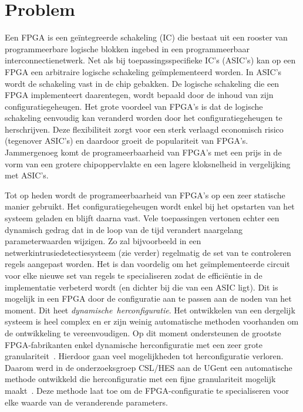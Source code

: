 \documentclass[a4paper,oneside,12pt]{article}
\begin{document}
\newpage

\tableofcontents

\clearpage

\section{Problem}

Een FPGA is een ge\"integreerde schakeling (IC) die bestaat uit een rooster van programmeerbare logische blokken ingebed in een programmeerbaar interconnectienetwerk. Net als bij toepassingsspecifieke IC's (ASIC's) kan op een FPGA een arbitraire logische schakeling ge\"implementeerd worden. In ASIC's wordt de schakeling vast in de chip gebakken. De logische schakeling die een FPGA implementeert daarentegen, wordt bepaald door de inhoud van zijn configuratiegeheugen. Het grote voordeel van FPGA's is dat de logische schakeling eenvoudig kan veranderd worden door het configuratiegeheugen te herschrijven. Deze flexibiliteit zorgt voor een sterk verlaagd economisch risico (tegenover ASIC's) en daardoor groeit de populariteit van FPGA's. Jammergenoeg komt de programeerbaarheid van FPGA's met een prijs in de vorm van een grotere chipoppervlakte en een lagere kloksnelheid in vergelijking met ASIC's.

Tot op heden wordt de programeerbaarheid van FPGA's op een zeer statische manier gebruikt. Het configuratiegeheugen wordt enkel bij het opstarten van het systeem geladen en blijft daarna vast. Vele toepassingen vertonen echter een dynamisch gedrag dat in de loop van de tijd verandert naargelang parameterwaarden wijzigen. Zo zal bijvoorbeeld in een netwerkintrusiedetectiesysteem (zie verder) regelmatig de set van te controleren regels aangepast worden. Het is dan voordelig om het ge\"implementeerde circuit voor elke nieuwe set van regels te specialiseren zodat de effici\"entie in de implementatie verbeterd wordt (en dichter bij die van een ASIC ligt). Dit is mogelijk in een FPGA door de configuratie aan te passen aan de noden van het moment. Dit heet \mbox{{\em dynamische herconfiguratie}}. Het ontwikkelen van een dergelijk systeem is heel complex en er zijn weinig automatische methoden voorhanden om de ontwikkeling te vereenvoudigen. Op dit moment ondersteunen de grootste FPGA-fabrikanten enkel dynamische herconfiguratie met een zeer grote granulariteit~\cite{XilinxRTRFlow1,XilinxRTRFlow2,stratix5}. Hierdoor gaan veel mogelijkheden tot herconfiguratie verloren. Daarom werd in de onderzoeksgroep CSL/HES aan de UGent een automatische methode ontwikkeld die herconfiguratie met een fijne granulariteit mogelijk maakt~\cite{reconf2008-kbruneel,fpl2008-kbruneel,phdkarel}. Deze methode laat toe om de FPGA-configuratie te specialiseren voor elke waarde van de veranderende parameters. 
\end{document}
